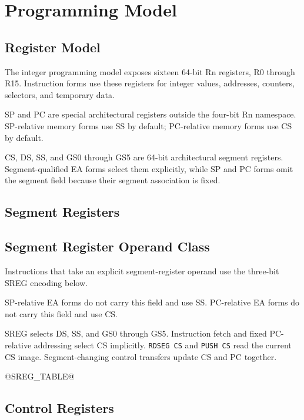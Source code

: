 \clearpage
\section{Programming Model}\label{page:programming-model}

\subsection{Register Model}\label{section:register-model}
The integer programming model exposes sixteen 64-bit Rn registers, R0 through R15. Instruction forms use these
registers for integer values, addresses, counters, selectors, and temporary data.

SP and PC are special architectural registers outside the four-bit Rn namespace. SP-relative memory forms use SS by
default; PC-relative memory forms use CS by default.

CS, DS, SS, and GS0 through GS5 are 64-bit architectural segment registers. Segment-qualified EA forms select them
explicitly, while SP and PC forms omit the segment field because their segment association is fixed.





\subsection{Segment Registers}\label{section:segment-registers}


\subsection{Segment Register Operand Class}
Instructions that take an explicit segment-register operand use the three-bit SREG encoding below.

SP-relative EA forms do not carry this field and use SS. PC-relative EA forms do not carry this field and use CS.

SREG selects DS, SS, and GS0 through GS5. Instruction fetch and fixed PC-relative addressing select CS implicitly.
\texttt{RDSEG CS} and \texttt{PUSH CS} read the current CS image. Segment-changing control transfers update CS and
PC together.

@SREG_TABLE@
\label{table:sreg-encoding}

\subsection{Control Registers}\label{section:control-registers}

